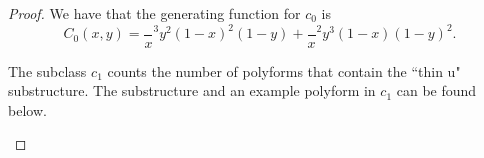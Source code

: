 \documentclass[12pt]{article}
\theoremstyle{plain}
\theoremstyle{definition}
\theoremstyle{remark}
\theoremstyle{definition}
\newcommand{\cellw}[4]{\draw[thick] ( #1 , #2 ) rectangle ( #3 , #4 );}
\newcommand{\cellb}[4]{\filldraw[black!60] ( #1 , #2 ) rectangle ( #3 , #4 ); \draw[thick] ( #1 , #2 ) rectangle ( #3 , #4 );}
\begin{document}
\begin{proof}
We have that the generating function for $c_0$ is
$$C_0(x,y)=\frac{}x^3y^2{(1-x)^2 (1-y)} + \frac{}x^2y^3{(1-x) (1-y)^2}.$$

The subclass $c_1$ counts the number of polyforms that contain the ``thin u" substructure. The substructure and an example polyform in $c_1$ can be found below. 

\begin{center}
    \begin{minipage}{0.45\textwidth}
        \centering
    \end{minipage}
    \begin{minipage}{0.45\textwidth}
        \centering
    \end{minipage}
\end{center}


\end{proof}
\end{document}
